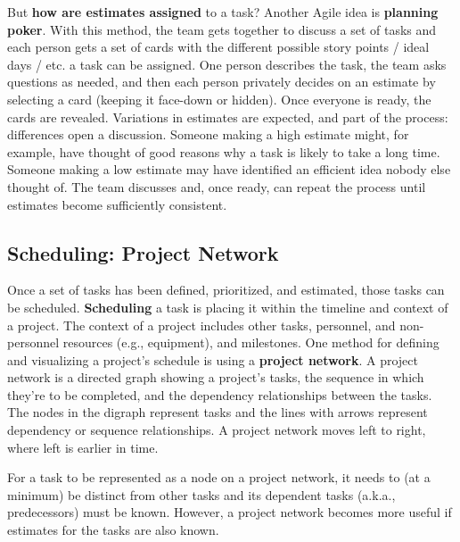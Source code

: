 But \textbf{how are estimates assigned} to a task? Another Agile idea is \textbf{planning poker}\marginpar{\planningPokerDef\margindivider}\marginpar{\schedulingDef\margindivider}\marginpar{\projectNetworkDef}. With this method, the team gets together to discuss a set of tasks and each person gets a set of cards with the different possible story points / ideal days / etc. a task can be assigned. One person describes the task, the team asks questions as needed, and then each person privately decides on an estimate by selecting a card (keeping it face-down or hidden). Once everyone is ready, the cards are revealed. Variations in estimates are expected, and part of the process: differences open a discussion. Someone making a high estimate might, for example, have thought of good reasons why a task is likely to take a long time. Someone making a low estimate may have identified an efficient idea nobody else thought of. The team discusses and, once ready, can repeat the process until estimates become sufficiently consistent.

\subsection{Scheduling: Project Network}

Once a set of tasks has been defined, prioritized, and estimated, those tasks can be scheduled. \textbf{Scheduling} a task is placing it within the timeline and context of a project. The context of a project includes other tasks, personnel, and non-personnel resources (e.g., equipment), and milestones. One method for defining and visualizing a project's schedule is using a \textbf{project network}. A project network is a directed graph showing a project's tasks, the sequence in which they're to be completed, and the dependency relationships between the tasks. The nodes in the digraph represent tasks and the lines with arrows represent dependency or sequence relationships. A project network moves left to right, where left is earlier in time.

For a task to be represented as a node on a project network, it needs to (at a minimum) be distinct from other tasks and its dependent tasks (a.k.a., predecessors) must be known. However, a project network becomes more useful if estimates for the tasks are also known.

